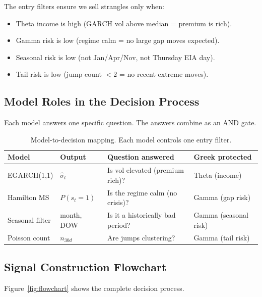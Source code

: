 \documentclass[11pt,a4paper]{article}
\begin{document}
The entry filters ensure we sell strangles only when:
\begin{itemize}[nosep]
\item Theta income is high (GARCH vol above median = premium is rich).
\item Gamma risk is low (regime calm = no large gap moves expected).
\item Seasonal risk is low (not Jan/Apr/Nov, not Thursday EIA day).
\item Tail risk is low (jump count $< 2$ = no recent extreme moves).
\end{itemize}

\subsection{Model Roles in the Decision Process}

Each model answers one specific question. The answers combine as an AND gate.

\begin{table}[H]
\centering
\caption{Model-to-decision mapping. Each model controls one entry filter.}
\begin{tabularx}{\textwidth}{llXl}
\toprule
Model & Output & Question answered & Greek protected \\
\midrule
EGARCH(1,1) & $\hat{\sigma}_t$ & Is vol elevated (premium rich)? & Theta (income) \\
Hamilton MS & $P(s_t=1)$ & Is the regime calm (no crisis)? & Gamma (gap risk) \\
Seasonal filter & month, DOW & Is it a historically bad period? & Gamma (seasonal risk) \\
Poisson count & $n_{30d}$ & Are jumps clustering? & Gamma (tail risk) \\
\bottomrule
\end{tabularx}
\end{table}

\subsection{Signal Construction Flowchart}

Figure~\ref{fig:flowchart} shows the complete decision process.
\end{document}
